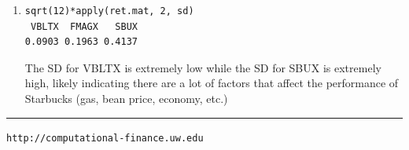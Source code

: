 \documentclass[letterpaper,12pt]{article}
\begin{document}
\begin{enumerate}
\item \begin{lstlisting}
sqrt(12)*apply(ret.mat, 2, sd)
 VBLTX  FMAGX   SBUX 
0.0903 0.1963 0.4137 
\end{lstlisting}
The SD for VBLTX is extremely low while the SD for SBUX is extremely high, likely indicating there are a lot of factors that affect the performance of Starbucks (gas, bean price, economy, etc.)
\end{enumerate}
\vfill \hrule \vspace{2mm} \centerline {\tt \tiny http://computational-finance.uw.edu}
\end{document}
